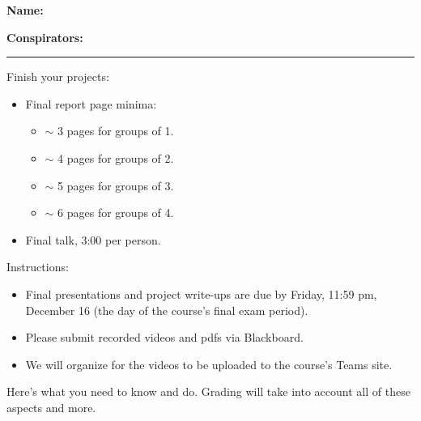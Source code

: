 \textbf{Name:} \\

\medskip

\textbf{Conspirators:} 

\medskip
\medskip

\hrule

\medskip


\assignmentsonly{\pleasesubmitprojectdraft}

Finish your projects:
\begin{itemize}
\item
  Final report page minima:
  \begin{itemize}
  \item[]
    $\sim$ 3 pages for groups of 1.
  \item[]
    $\sim$ 4 pages for groups of 2.
  \item[]
    $\sim$ 5 pages for groups of 3.
  \item[]
    $\sim$ 6 pages for groups of 4.
  \end{itemize}
\item
  Final talk, 3:00 per person.
\end{itemize}

Instructions:

\begin{itemize}
\item 
  Final presentations and project write-ups are due by Friday, 11:59 pm, December 16
  (the day of the course's final exam period).
\item 
  Please submit recorded videos and pdfs via Blackboard.
\item
  We will organize for the videos to be uploaded to the course's Teams site.
\end{itemize}


Here's what you need to know and do. Grading will take into account all of these aspects and more.


